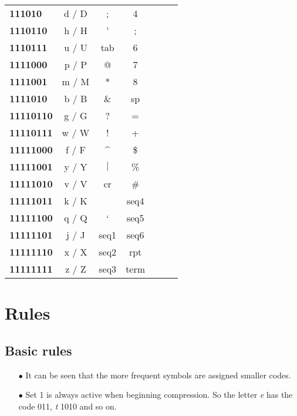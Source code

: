 \documentclass[]{article}
\begin{document}
\begin{center}
\begin{tabular}{ | l | c | c | c | c | c | c | }
		\textbf{111010} & d / D & ; & 4 & & \\ \cline{1-4}
		\textbf{1110110} & h / H & ' & ; & & \\ \cline{1-4}
		\textbf{1110111} & u / U & tab & 6 & & \\ \cline{1-4}
		\textbf{1111000} & p / P & @ & 7 & & \\ \cline{1-4}
		\textbf{1111001} & m / M & * & 8 & & \\ \cline{1-4}
		\textbf{1111010} & b / B & \& & sp & & \\ \cline{1-4}
		\textbf{11110110} & g / G & ? & = & & \\ \cline{1-4}
		\textbf{11110111} & w / W & ! & + & & \\ \cline{1-4}
		\textbf{11111000} & f / F & \^{} & \$ & & \\ \cline{1-4}
		\textbf{11111001} & y / Y & $|$ & \% & & \\ \cline{1-4}
		\textbf{11111010} & v / V & cr & \# & & \\ \cline{1-4}
		\textbf{11111011} & k / K & ~ & seq4 & & \\ \cline{1-4}
		\textbf{11111100} & q / Q & ` & seq5 & & \\ \cline{1-4}
		\textbf{11111101} & j / J & seq1 & seq6 & & \\ \cline{1-4}
		\textbf{11111110} & x / X & seq2 & rpt & & \\ \cline{1-4}
		\textbf{11111111} & z / Z & seq3 & term & & \\ \hline
	\end{tabular}
\end{center}

\section{Rules}

\subsection{Basic rules}
\begin{itemize}
	\item[$\bullet$] It can be seen that the more frequent symbols are assigned smaller codes.
	\item[$\bullet$] Set 1 is always active when beginning compression.  So the letter \emph{e} has the code 011, \emph{t} 1010 and so on.
\end{itemize}
\end{document}
